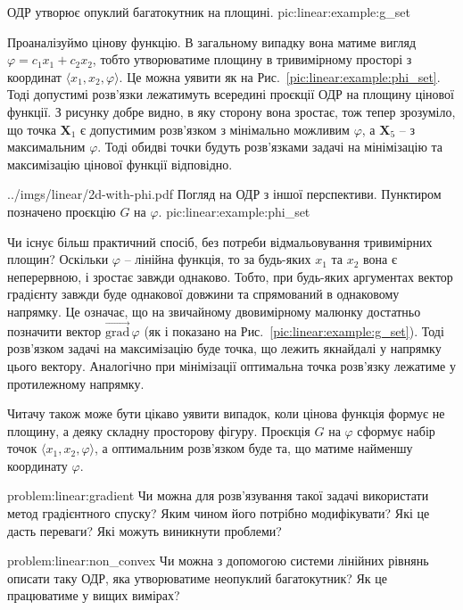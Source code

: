 \documentclass[\main/book.tex]{subfiles}
\begin{document}
 {ОДР утворює опуклий багатокутник на площині.}
 {pic:linear:example:g_set}

Проаналізуймо цінову функцію. В загальному випадку вона матиме вигляд $\varphi = c_1 x_1 + c_2 x_2$, тобто утворюватиме площину в тривимірному просторі з координат $\langle x_1, x_2, \varphi \rangle$. Це можна уявити як на Рис.~\ref{pic:linear:example:phi_set}. Тоді допустимі розв'язки лежатимуть всередині проєкції ОДР на площину цінової функції. З рисунку добре видно, в яку сторону вона зростає, тож тепер зрозуміло, що точка $\mathbf{X}_1$ є допустимим розв'язком з мінімально можливим $\varphi$, а $\mathbf{X}_5$ -- з максимальним $\varphi$. Тоді обидві точки будуть розв'язками задачі на мінімізацію та максимізацію цінової функції відповідно.

\illustration
 {../imgs/linear/2d-with-phi.pdf}
 {Погляд на ОДР з іншої перспективи. Пунктиром позначено проєкцію $G$ на $\varphi$.}
 {pic:linear:example:phi_set}

Чи існує більш практичний спосіб, без потреби відмальовування тривимірних площин? Оскільки $\varphi$ -- лінійна функція, то за будь-яких $x_1$ та $x_2$ вона є неперервною, і зростає завжди однаково. Тобто, при будь-яких аргументах вектор градієнту завжди буде однакової довжини та спрямований в однаковому напрямку. Це означає, що на звичайному двовимірному малюнку достатньо позначити вектор $\overrightarrow{\mathrm{grad}}\,\varphi$ (як і показано на Рис.~\ref{pic:linear:example:g_set}). Тоді розв'язком задачі на максимізацію буде точка, що лежить якнайдалі у напрямку цього вектору. Аналогічно при мінімізації оптимальна точка розв'язку лежатиме у протилежному напрямку.

\begin{note}
 Читачу також може бути цікаво уявити випадок, коли цінова функція формує не площину, а деяку складну просторову фігуру. Проєкція $G$ на $\varphi$ сформує набір точок $\langle x_1, x_2, \varphi \rangle$, а оптимальним розв'язком буде та, що матиме найменшу координату $\varphi$.
\end{note}

\begin{problem}{problem:linear:gradient}
 Чи можна для розв'язування такої задачі використати метод градієнтного спуску? Яким чином його потрібно модифікувати? Які це дасть переваги? Які можуть виникнути проблеми?
\end{problem}

\begin{problem}{problem:linear:non_convex}
 Чи можна з допомогою системи лінійних рівнянь описати таку ОДР, яка утворюватиме неопуклий багатокутник? Як це працюватиме у вищих вимірах?
\end{problem}
\end{document}
